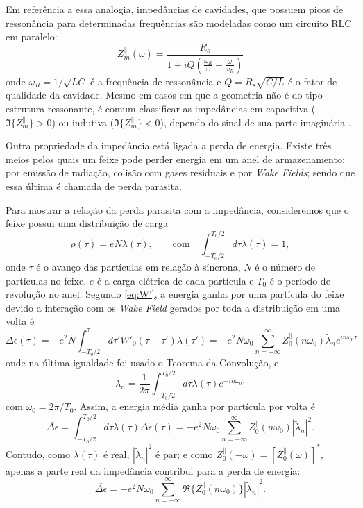 Em referência a essa analogia, impedâncias de cavidades, que possuem picos de ressonância para determinadas frequências são modeladas como um circuito RLC em paralelo:
\begin{equation}
 Z_m^\lVert(\omega)= \frac{R_s}{1+iQ
\left(\frac{\omega_R}{\omega}-\frac{\omega}{\omega_R}\right)}
\end{equation}
onde $\omega_R = 1/\sqrt{LC}$ é a frequência de ressonância e $Q=R_s \sqrt{C/L}$ é o fator de qualidade da cavidade. Mesmo em casos em que a geometria não é do tipo estrutura ressonante, é comum classificar as impedâncias em capacitiva ($\Im\{Z_m^\lVert\}>0$) ou indutiva ($\Im\{Z_m^\lVert\}<0$), dependo do sinal de sua parte imaginária \cite{Chao}.

Outra propriedade da impedância está ligada a perda de energia. Existe três meios pelos quais um feixe pode perder energia em um anel de armazenamento: por emissão de radiação, colisão com gases residuais e por \textit{Wake Fields}; sendo que essa última é chamada de perda parasita.

Para mostrar a relação da perda parasita com a impedância, consideremos que o feixe possui uma distribuição de carga 
\begin{equation}\nonumber
\rho(\tau)= e N\lambda(\tau),\qquad \text{com} \quad\int_{-T_0/2}^{T_0/2} \!\! d \tau \lambda(\tau) = 1,
\end{equation}
onde $\tau$ é o avanço das partículas em relação à síncrona, $N$ é o número de partículas no feixe, $e$ é a carga elétrica de cada partícula e $T_0$ é o período de revolução no anel. Segundo \eqref{eq:W'}, a energia ganha por uma partícula do feixe devido a interação com os \textit{Wake Field} gerados por toda a distribuição em uma volta é
\begin{equation}\nonumber
\Delta \epsilon(\tau) = -e^2 N \int_{-T_0/2}^{\tau} \!\! d\tau'
W'_0(\tau-\tau')\lambda(\tau') = -e^2 N \omega_0\sum_{n=-\infty}^{\infty}
Z_0^\lVert(n\omega_0) \tilde{\lambda}_n e^{in\omega_0\tau}
\end{equation}
onde na última igualdade foi usado o Teorema da Convolução, e
\begin{displaymath}
 \tilde{\lambda}_n =
\frac{1}{2\pi}\int_{-T_0/2}^{T_0/2}\!\!d\tau\lambda(\tau)e^{-in\omega_0\tau}
\end{displaymath}
com $\omega_0 = 2\pi/T_0$. Assim, a energia média ganha por partícula por volta é
\begin{equation}\nonumber
\overline{\Delta \epsilon} = \int_{-T_0/2}^{T_0/2}\!\! d\tau \lambda(\tau)
\Delta \epsilon(\tau) = -e^2 N\omega_0 \sum_{n=-\infty}^{\infty}
Z_0^\lVert(n\omega_0) |\tilde{\lambda}_n|^2.
\end{equation}
Contudo, como $\lambda(\tau)$ é real, $|\tilde{\lambda}_n|^2$ é par; e como $ Z_0^\lVert(-\omega) = [Z_0^\lVert(\omega)]^*$, apenas a parte real da impedância contribui para a perda de energia:
\begin{equation}\label{eq:energiaperdida}
\overline{\Delta \epsilon} = -e^2 N\omega_0 \sum_{n=-\infty}^{\infty}
\Re\{Z_0^\lVert(n\omega_0)\} |\tilde{\lambda}_n|^2.
\end{equation}

